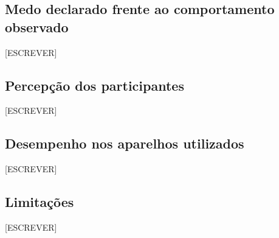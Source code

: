 \subsection{Medo declarado frente ao comportamento observado}

%
[ESCREVER]

\subsection{Percepção dos participantes}

[ESCREVER]

\subsection{Desempenho nos aparelhos utilizados}

[ESCREVER]

\subsection{Limitações}

%
[ESCREVER]
